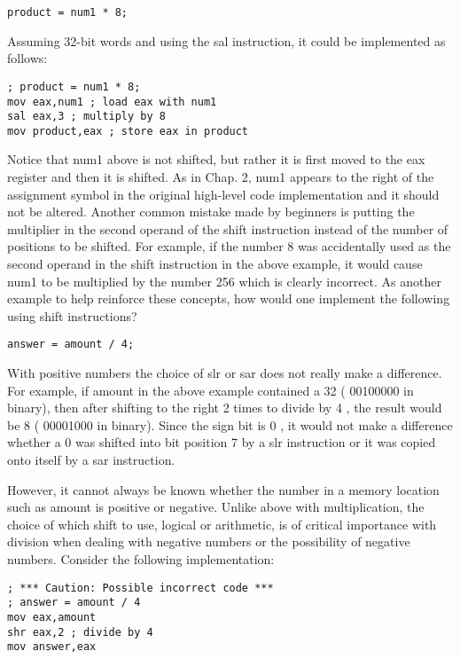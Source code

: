 \documentclass[10pt]{article}
\begin{document}
\begin{verbatim}
product = num1 * 8;
\end{verbatim}

Assuming 32-bit words and using the sal instruction, it could be implemented as follows:

\begin{verbatim}
; product = num1 * 8;
mov eax,num1 ; load eax with num1
sal eax,3 ; multiply by 8
mov product,eax ; store eax in product
\end{verbatim}

Notice that num1 above is not shifted, but rather it is first moved to the eax register and then it is shifted. As in Chap. 2, num1 appears to the right of the assignment symbol in the original high-level code implementation and it should not be altered. Another common mistake made by beginners is putting the multiplier in the second operand of the shift instruction instead of the number of positions to be shifted. For example, if the number 8 was accidentally used as the second operand in the shift instruction in the above example, it would cause num1 to be multiplied by the number 256 which is clearly incorrect. As another example to help reinforce these concepts, how would one implement the following using shift instructions?

\begin{verbatim}
answer = amount / 4;
\end{verbatim}

With positive numbers the choice of slr or sar does not really make a difference. For example, if amount in the above example contained a 32 ( 00100000 in binary), then after shifting to the right 2 times to divide by 4 , the result would be 8 ( 00001000 in binary). Since the sign bit is 0 , it would not make a difference whether a 0 was shifted into bit position 7 by a slr instruction or it was copied onto itself by a sar instruction.

However, it cannot always be known whether the number in a memory location such as amount is positive or negative. Unlike above with multiplication, the choice of which shift to use, logical or arithmetic, is of critical importance with division when dealing with negative numbers or the possibility of negative numbers. Consider the following implementation:

\begin{verbatim}
; *** Caution: Possible incorrect code ***
; answer = amount / 4
mov eax,amount
shr eax,2 ; divide by 4
mov answer,eax
\end{verbatim}
\end{document}
